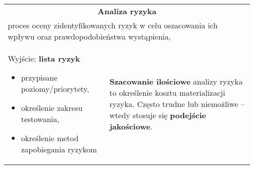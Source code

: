 \documentclass[../main.tex]{subfiles}
\begin{document}
    \begin{table}[H]
        \begin{center}
            \begin{tabular}{| p{8cm}  p{8cm} |}
                \hline
                \multicolumn{2}{|c|}{\textbf{Analiza ryzyka}}\\
                \multicolumn{2}{|p{16,5cm}|}{proces oceny zidentyfikowanych ryzyk w celu oszacowania ich wpływu
                oraz prawdopodobieństwa wystąpienia,}\\
                \hline
                Wyjście: \textbf{lista ryzyk}
                \begin{itemize}
                    \item przypisane poziomy/priorytety,
                    \item określenie zakresu testowania,
                    \item określenie metod zapobiegania ryzykom
                \end{itemize}
                &
                \textbf{Szacowanie ilościowe} analizy ryzyka to określenie kosztu materializacji ryzyka.
                Często trudne lub niemożliwe – wtedy stosuje się \textbf{podejście jakościowe}.\\



\end{tabular}
\end{center}
\end{table}
\end{document}

